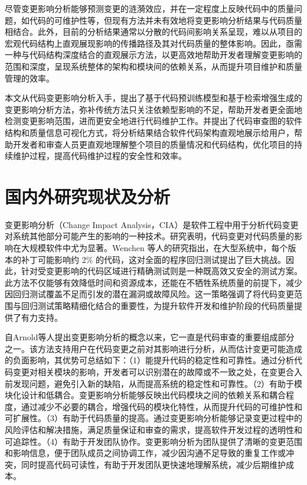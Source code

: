 尽管变更影响分析能够预测变更的涟漪效应，并在一定程度上反映代码中的质量问题，如代码的可维护性等\cite{KRETSOU2021110892,2025Change}，但现有方法并未有效地将变更影响分析结果与代码质量相结合。此外，目前的分析结果通常以分散的代码间影响关系呈现，难以从项目的宏观代码结构上直观展现影响的传播路径及其对代码质量的整体影响。因此，亟需一种与代码结构深度结合的直观展示方法，以更高效地帮助开发者理解变更影响的范围和深度，呈现系统整体的架构和模块间的依赖关系，从而提升项目维护和质量管理的效率。


本文从代码变更影响分析入手，提出了基于代码预训练模型和基于检索增强生成的变更影响分析方法，弥补传统方法只关注依赖型影响的不足，帮助开发者更全面地检测变更影响范围，进而更安全地进行代码维护工作。并提出了代码审查图的软件结构和质量信息可视化方式，将分析结果结合软件代码架构直观地展示给用户，帮助开发者和审查人员更直观地理解整个项目的质量情况和代码结构，优化项目的持续维护过程，提高代码维护过程的安全性和效率。


\section{国内外研究现状及分析}

变更影响分析（Change Impact Analysis，CIA）是软件工程中用于分析代码变更对系统其他部分可能产生的影响的一种技术。研究表明，代码变更对代码质量的影响在大规模软件中尤为显著。Wenchen 等人的研究指出\cite{2013Large}，在大型系统中，每个版本的补丁可能影响约 2\% 的代码，这对全面的程序回归测试提出了巨大挑战。因此，针对受变更影响的代码区域进行精确测试则是一种既高效又安全的测试方案。此方法不仅能够有效降低时间和资源成本，还能在不牺牲系统质量的前提下，减少因回归测试覆盖不足而引发的潜在漏洞或故障风险。这一策略强调了将代码变更范围与回归测试策略精细化结合的重要性，为提升软件开发和维护阶段的代码质量提供了有力支持。

自Arnold等人\cite{Arnold1996}提出变更影响分析的概念以来，它一直是代码审查的重要组成部分之一。该方法支持用户在代码变更之前对其影响进行分析，从而估计变更可能造成的负面影响，其优势可总结如下：（1）能提升代码的稳定性和可靠性\cite{KRETSOU2021110892}。通过分析代码变更对相关模块的影响，开发者可以识别潜在的故障或不一致之处，在变更合入前发现问题，避免引入新的缺陷，从而提高系统的稳定性和可靠性。（2）有助于模块化设计和低耦合。变更影响分析能够反映出代码模块之间的依赖关系和耦合程度，通过减少不必要的耦合，增强代码的模块化特性，从而提升代码的可维护性和可扩展性。（3）有助于代码质量的提高。通过变更影响分析能够记录变更过程中的风险评估和解决措施，满足质量保证和审查的需求，提高软件开发过程的透明性和可追踪性。（4）有助于开发团队协作。变更影响分析为团队提供了清晰的变更范围和影响信息，便于团队成员之间协调工作，减少因沟通不足导致的重复工作或冲突，同时提高代码可读性，有助于开发团队更快速地理解系统，减少后期维护成本。

